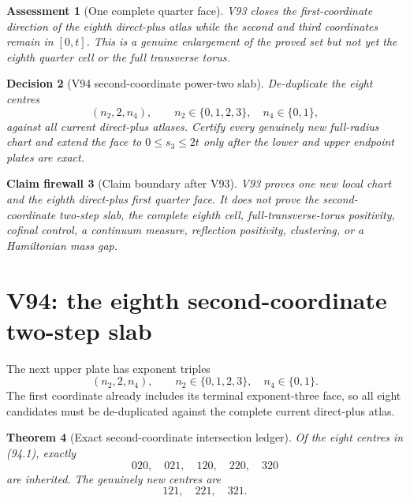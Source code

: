 \documentclass[11pt,oneside]{article}
\newtheorem{theorem}{Theorem}[section]
\newtheorem{assessment}[theorem]{Assessment}
\newtheorem{firewall}[theorem]{Claim firewall}
\newtheorem{decision}[theorem]{Decision}
\theoremstyle{definition}
\theoremstyle{remark}
\begin{document}
\begin{assessment}[One complete quarter face]
\label{ass:newv93}
V93 closes the first-coordinate direction of the eighth direct-plus
atlas while the second and third coordinates remain in
\([0,t]\).  This is a genuine enlargement of the proved set but not
yet the eighth quarter cell or the full transverse torus.
\end{assessment}

\begin{decision}[V94 second-coordinate power-two slab]
\label{dec:newv93-next}
De-duplicate the eight centres
\[
 (n_2,2,n_4),\qquad n_2\in\{0,1,2,3\},\quad
 n_4\in\{0,1\},                                      \tag{93.9}
\]
against all current direct-plus atlases.  Certify every genuinely
new full-radius chart and extend the face to \(0\leq s_3\leq2t\)
only after the lower and upper endpoint plates are exact.
\end{decision}

\begin{firewall}[Claim boundary after V93]
\label{fire:newv93-final}
V93 proves one new local chart and the eighth direct-plus first
quarter face.  It does not prove the second-coordinate two-step
slab, the complete eighth cell, full-transverse-torus positivity,
cofinal control, a continuum measure, reflection positivity,
clustering, or a Hamiltonian mass gap.
\end{firewall}

\section{V94: the eighth second-coordinate two-step slab}
\label{sec:newv94-eighth-second-two-step}

The next upper plate has exponent triples
\[
 (n_2,2,n_4),\qquad n_2\in\{0,1,2,3\},\quad
 n_4\in\{0,1\}.                                     \tag{94.1}
\]
The first coordinate already includes its terminal exponent-three
face, so all eight candidates must be de-duplicated against the
complete current direct-plus atlas.

\begin{theorem}[Exact second-coordinate intersection ledger]
\label{thm:newv94-intersection}
Of the eight centres in (94.1), exactly
\[
 020,\quad021,\quad120,\quad220,\quad320             \tag{94.2}
\]
are inherited.  The genuinely new centres are
\[
 121,\quad221,\quad321.                              \tag{94.3}
\]
\end{theorem}
\end{document}

